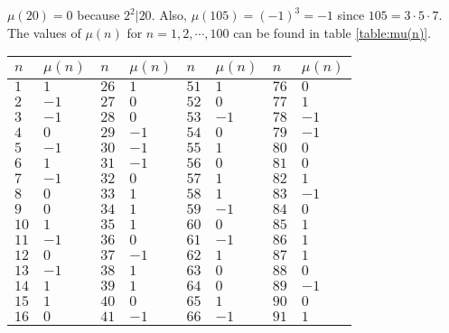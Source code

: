 \documentclass[12pt]{subfile}
\begin{document}
		\begin{example}
			$\mu(20)=0$ because $2^2|20$. Also, $\mu(105)=(-1)^3=-1$ since $105=3\cdot5 \cdot 7$. The values of $\mu(n)$ for $n=1,2,\cdots,100$ can be found in table \eqref{table:mu(n)}.
			
			
			
			\begin{table}
				\centering
				\begin{tabular}{ | l | l | l | l | l | l | l | l | }
					\hline
					$n$  &
					     $\mu(n)$&
					               $n$  &
					                   $\mu(n)$&
					                            $n$   & 
					                                 $\mu(n)$&
					                                            $n$  &
					                                                  $\mu(n)$ \\ \hline
					$1$  & $1$   & $26$ & $1$  & $51$ & $1$  & $76$  & $0$     \\ \hline
					$2$  & $-1$  & $27$ & $0$  & $52$ & $0$  & $77$  & $1$     \\ \hline
					$3$  & $-1$  & $28$ & $0$  & $53$ & $-1$ & $78$  & $-1$    \\ \hline
					$4$  & $0$   & $29$ & $-1$ & $54$ & $0$  & $79$  & $-1$    \\ \hline
					$5$  & $-1$  & $30$ & $-1$ & $55$ & $1$  & $80$  & $0$     \\ \hline
					$6$  & $1$   & $31$ & $-1$ & $56$ & $0$  & $81$  & $0$     \\ \hline
					$7$  & $-1$  & $32$ & $0$  & $57$ & $1$  & $82$  & $1$     \\ \hline
					$8$  & $0$   & $33$ & $1$  & $58$ & $1$  & $83$  & $-1$    \\ \hline
					$9$  & $0$   & $34$ & $1$  & $59$ & $-1$ & $84$  & $0$     \\ \hline
					$10$ & $1$   & $35$ & $1$  & $60$ & $0$  & $85$  & $1$     \\ \hline
					$11$ & $-1$  & $36$ & $0$  & $61$ & $-1$ & $86$  & $1$     \\ \hline
					$12$ & $0$   & $37$ & $-1$ & $62$ & $1$  & $87$  & $1$     \\ \hline
					$13$ & $-1$  & $38$ & $1$  & $63$ & $0$  & $88$  & $0$     \\ \hline
					$14$ & $1$   & $39$ & $1$  & $64$ & $0$  & $89$  & $-1$    \\ \hline
					$15$ & $1$   & $40$ & $0$  & $65$ & $1$  & $90$  & $0$     \\ \hline
					$16$ & $0$   & $41$ & $-1$ & $66$ & $-1$ & $91$  & $1$     \\ \hline

\end{tabular}
\end{table}
\end{example}
\end{document}
